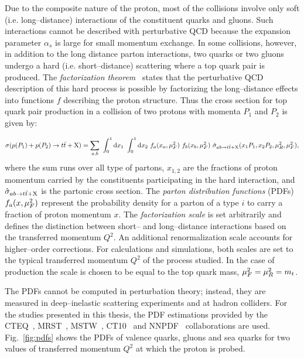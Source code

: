 Due to the composite nature of the proton, most of the
collisions involve only soft (i.e. long--distance) interactions of the
constituent quarks and gluons. Such interactions cannot be described
with perturbative QCD because the expansion parameter $\alpha_s$ is
large for small momentum exchange.
In some collisions, however, in addition to the long distance parton
interactions, two quarks or two gluons undergo a hard
(i.e. short--distance) scattering where a top quark pair is produced.
The {\it factorization theorem}~\cite{factorprinciple} states that
the perturbative QCD description of this hard process is possible by
factorizing the long--distance effects into functions $f$ describing the
proton structure. Thus the cross section for top quark pair
production in a collision of two protons with momenta $P_1$ and $P_2$
is given by:\par\noindent
{\small
\begin{equation}
  \sigma(p(P_1)+p(P_2)\to t\bar{t}{}+{\rm X})
  = 
  \sum_{a,b}
  ~\int_0^1{\rm d}x_1
  ~\int_0^1{\rm d}x_2
  ~ f_a(x_a,\mu_F^2{})~f_b(x_b,\mu_F^2)
  ~\hat{\sigma}_{ab\to t\bar{t}{}+\rm{X}}(x_1P_1,x_2P_2,\mu_R^2{},\mu_F^2{}),
  \label{eq:ttbarxs}
\end{equation}
}
where the sum runs over all type of partons, $x_{1,2}$ are the
fractions of proton momentum carried by the constituents participating
in the hard interaction, and $\hat{\sigma}_{ab\to t\bar{t}{}+\rm{X}}$ is
  the partonic cross section. 
The {\it parton distribution functions} (PDFs) $f_a(x,\mu_F^2{})$
represent the probability density for a parton of a type $i$ to carry
a fraction of proton momentum $x$. The {\it factorization scale}
\factscale{} is set arbitrarily and defines the distinction between
short-- and long--distance interactions based on the transferred
momentum $Q^2$. An additional renormalization scale \renormscale{}
accounts for higher--order corrections. For calculations and
simulations, both scales are set to the typical transferred momentum $Q^2$
of the process studied. In the case of \ttbar{} production the scale
is chosen to be equal to the top quark mass,
$\mu_F^2{}=\mu_R^2{}=m_t$.
  
The PDFs cannot be computed in perturbation theory; instead, they are
measured in deep--inelastic scattering experiments and at hadron colliders.
For the studies presented in this thesis, the PDF estimations
provided by the CTEQ~\cite{cteq6}, MRST~\cite{mrst}, MSTW~\cite{mstw},
CT10~\cite{ct10} and NNPDF~\cite{nnpdf} collaborations are
used. Fig.~\ref{fig:pdfs} shows the PDFs of valence quarks, gluons and
sea quarks for two values of transferred momentum $Q^2$ at which the
proton is probed. 

